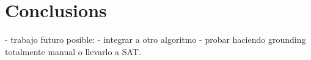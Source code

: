 \section{Conclusions}
- trabajo futuro posible: 
- integrar a otro algoritmo
- probar haciendo grounding totalmente manual o llevarlo a SAT.
